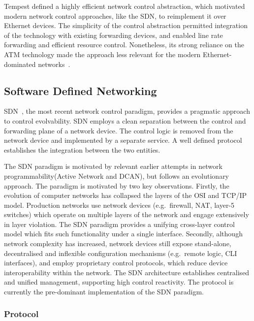 Tempest defined a highly efficient network control abstraction, which motivated
modern network control approaches, like the SDN, to reimplement it over Ethernet
devices.  The simplicity of the control abstraction permitted
integration of the technology with existing forwarding devices, and enabled line
rate forwarding and efficient resource control.  Nonetheless, its strong
reliance on the ATM technology made the approach less relevant for the modern
Ethernet-dominated networks~. 

\subsection{Software Defined Networking}\label{sec:background:sdn} 

SDN~, the most recent network control paradigm, provides a pragmatic
approach to control evolvability. SDN employs  a clean separation between the
control and forwarding plane of a network device. The control logic is
removed from the network device and implemented by a separate service.  A well
defined protocol establishes the integration between the two entities. 

The SDN paradigm is motivated by relevant earlier attempts in network
programmability(Active Network and DCAN), but follows an evolutionary approach.
The paradigm is motivated by two key observations.  Firstly, the evolution of
computer networks has collapsed the layers of the OSI and TCP/IP model.
Production networks use network devices (e.g.~firewall, NAT, layer-5 switches)
which operate on multiple layers of the network and engage extensively in layer
violation.  The SDN paradigm provides a unifying cross-layer control model which
fits such functionality under a single interface.  Secondly, although network
complexity has increased, network devices still expose stand-alone,
decentralised and inflexible configuration mechanisms (e.g.~remote logic, CLI
interfaces), and employ proprietary control protocols, which reduce device
interoperability within the network. The SDN architecture establishes
centralised and unified management, supporting high control reactivity.  The \of
protocol is currently the pre-dominant implementation of the SDN paradigm.

\subsubsection*{\of Protocol} 

